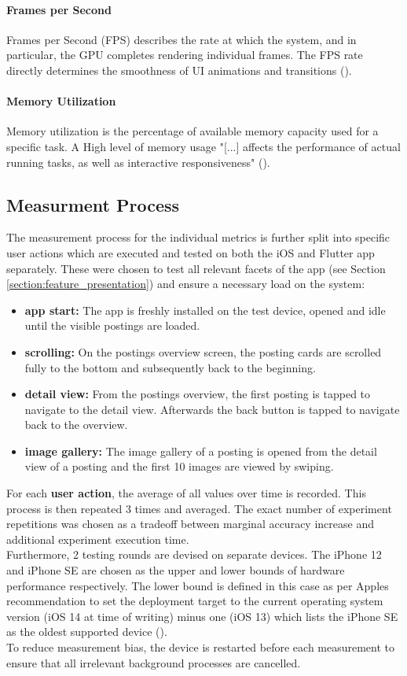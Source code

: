 \paragraph*{Frames per Second}\hfill \break
Frames per Second (FPS) describes the rate at which the system, and in particular, the GPU
completes rendering individual frames. The FPS rate directly determines the smoothness of UI
animations and transitions (\cite{Google2020}).

\paragraph*{Memory Utilization}\hfill \break
Memory utilization is the percentage of available memory capacity used for a specific task. A
High level of memory usage "[...] affects the performance of actual running tasks, as well as
interactive responsiveness" (\cite{Ljubuncic2015}).

\subsection{Measurment Process} \label{subsection::measurement_process}
The measurement process for the individual metrics is further split into specific user actions
which are executed and tested on both the iOS and Flutter app separately. These were chosen
to test all relevant facets of the app (see Section \ref{section:feature_presentation}) and ensure a necessary load on the system:
\begin{itemize}
    \item \textbf{app start:} The app is freshly installed on the test device, opened and idle until the visible postings are loaded.
    \item \textbf{scrolling:} On the postings overview screen, the posting cards are scrolled fully to the bottom and subsequently back to the beginning.
    \item \textbf{detail view:} From the postings overview, the first posting is tapped to navigate to the detail view. Afterwards the back button is tapped to navigate back to the overview.
    \item \textbf{image gallery:} The image gallery of a posting is opened from the detail view of a posting and the first 10 images are viewed by swiping.
\end{itemize}
For each \textbf{user action}, the average of all values over time is recorded. This process is then
repeated 3 times and averaged. The exact number of experiment repetitions was chosen as a
tradeoff between marginal accuracy increase and additional experiment execution time.\\
Furthermore, 2 testing rounds are devised on separate devices. The iPhone 12 and iPhone
SE are chosen as the upper and lower bounds of hardware performance respectively. The lower
bound is defined in this case as per Apples recommendation to set the deployment target to the
current operating system version (iOS 14 at time of writing) minus one (iOS 13) which lists the
iPhone SE as the oldest supported device (\cite{Apple2021}).\\
To reduce measurement bias, the device is restarted before each measurement to ensure that all
irrelevant background processes are cancelled.


